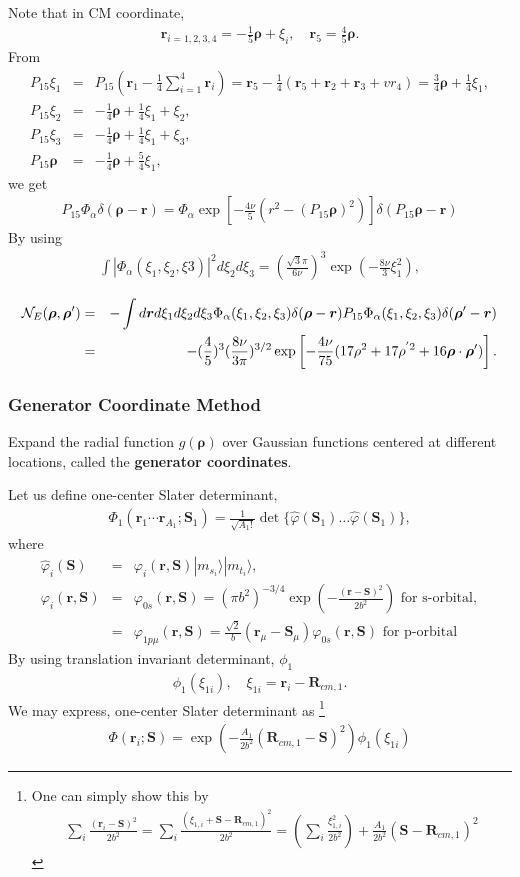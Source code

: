 \documentclass[11pt]{article}
\def\bm{\boldsymbol}
\newcommand{\bea}{\begin{eqnarray}}
\newcommand{\eea}{\end{eqnarray}}
\newcommand{\no}{\nonumber \\}
\newcommand{\vrho}{{\bm \rho}}
\newcommand{\vr}{{\bm r}}
\newcommand{\vR}{{\bm R}}
\newcommand{\ra}{\rangle}
\begin{document}
Note that in CM coordinate,
\bea 
\vr_{i=1,2,3,4}=-\frac{1}{5}\vrho+\xi_i,\quad 
\vr_5=\frac{4}{5}\vrho.  
\eea 
From
\bea 
P_{15}\xi_1&=& P_{15}
  \left(\vr_1-\frac{1}{4}\sum_{i=1}^4\vr_i \right) 
 =\vr_5-\frac{1}{4}(\vr_5+\vr_2+\vr_3+vr_4)
 =\frac{3}{4}\vrho+\frac{1}{4}\xi_1,\no 
 P_{15}\xi_2&=& -\frac{1}{4}\vrho+\frac{1}{4}\xi_1+\xi_2,\no 
 P_{15}\xi_3&=& -\frac{1}{4}\vrho+\frac{1}{4}\xi_1+\xi_3,\no 
 P_{15}\vrho&=&-\frac{1}{4}\vrho+\frac{5}{4}\xi_1,
\eea 
we get 
\bea 
P_{15}\Phi_\alpha\delta(\vrho-\vr)
=\Phi_\alpha\exp\left[-\frac{4\nu}{5}(r^2-(P_{15}\vrho)^2)   \right]\delta(P_{15}\vrho-\vr)
\eea 
By using 
\bea 
\int |\Phi_\alpha(\xi_1,\xi_2,\xi3)|^2d\xi_2 d\xi_3=
\left(\frac{\sqrt{3}\pi}{6\nu}\right)^3 \exp(-\frac{8\nu}{3}\xi_1^2),
\eea 

\bea 
{\cal N}_{E}(\vrho,\vrho')
&=&-\int d\vr d\xi_1 d\xi_2 d\xi_3 \Phi_\alpha(\xi_1,\xi_2,\xi_3)
\delta(\vrho-\vr) P_{15}\Phi_\alpha(\xi_1,\xi_2,\xi_3)
\delta(\vrho'-\vr) \no 
&=&-(\frac{4}{5})^3(\frac{8\nu}{3\pi})^{3/2}
 \exp\left[ -\frac{4\nu}{75}(17\rho^2+17\rho^{'2}+16\vrho\cdot\vrho')
 \right].  
\eea 

\subsubsection{Generator Coordinate Method}
Expand the radial function $g(\vrho)$ over Gaussian
functions centered at different locations,
called the {\bf generator coordinates}.

Let us define one-center Slater determinant,
\bea 
\Phi_1(\vr_1\cdots \vr_{A_1}; {\bm S}_1)
=\frac{1}{\sqrt{A_1!}} \det \{\hat{\varphi}({\bm S}_1) \dots
  \hat{\varphi}({\bm S}_1) \},
\eea 
where 
\bea 
\hat{\varphi}_i({\bm S})&=&\varphi_i(\vr,{\bm S})|m_{s_i}\ra 
  |m_{t_i}\ra,\no 
 \varphi_i(\vr,{\bm S})
 &=& \varphi_{0s}(\vr,{\bm S})=(\pi b^2)^{-3/4}
  \exp(- \frac{(\vr-{\bm S})^2}{2b^2} ) \mbox{ for s-orbital},\no 
 &=& \varphi_{1p\mu}(\vr,{\bm S})
    =\frac{\sqrt{2}}{b}(\vr_\mu-{\bm S}_\mu)\varphi_{0s}(\vr,{\bm S})  \mbox{ for p-orbital}
\eea 
By using translation invariant determinant, $\phi_1$
\bea 
\phi_1(\xi_{1i}) ,\quad \xi_{1i}=\vr_i-{\vR}_{cm,1}.
\eea 
We may express, one-center Slater determinant as
\footnote{
One can simply show this by 
\bea 
 \sum_{i}\frac{(\vr_i-{\bm S})^2}{2b^2}
=\sum_{i}\frac{(\xi_{1,i}+{\bm S}-\vR_{cm,1})^2}{2b^2}
=\left(\sum_{i}\frac{\xi_{1,i}^2}{2b^2} \right) 
 +\frac{A_1}{2b^2} ({\bm S}-\vR_{cm,1})^2
\eea 
} 
\bea 
\Phi(\vr_{i};{\bm S} )
=\exp\left(-\frac{A_1}{2b^2}(\vR_{cm,1}-{\bm S})^2\right) \phi_1(\xi_{1i}) 
\eea 
\end{document}
